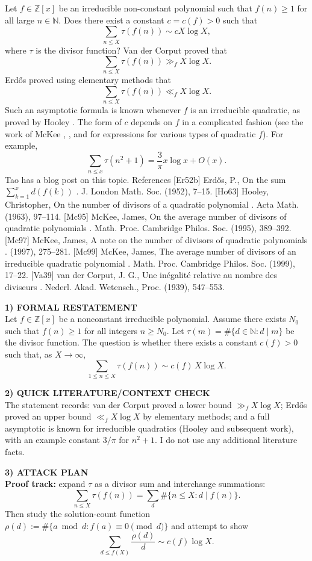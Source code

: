 Let $f\in \mathbb{Z}[x]$ be an irreducible non-constant polynomial such that $f(n)\geq 1$ for all large $n\in\mathbb{N}$. Does there exist a constant $c=c(f)>0$ such that\[\sum_{n\leq X} \tau(f(n))\sim cX\log X,\]where $\tau$ is the divisor function? Van der Corput \cite{Va39} proved that\[\sum_{n\leq X} \tau(f(n))\gg_f X\log X.\]Erd\H{o}s \cite{Er52b} proved using elementary methods that\[\sum_{n\leq X} \tau(f(n))\ll_f X\log X.\]Such an asymptotic formula is known whenever $f$ is an irreducible quadratic, as proved by Hooley \cite{Ho63}. The form of $c$ depends on $f$ in a complicated fashion (see the work of McKee \cite{Mc95}, \cite{Mc97}, and \cite{Mc99} for expressions for various types of quadratic $f$). For example,\[\sum_{n\leq x}\tau(n^2+1)=\frac{3}{\pi}x\log x+O(x).\]Tao has a blog post on this topic. References [Er52b] Erd\H{o}s, P., On the sum {$\sum^x_{k=1} d(f(k))$} . J. London Math. Soc. (1952), 7--15. [Ho63] Hooley, Christopher, On the number of divisors of a quadratic polynomial . Acta Math. (1963), 97--114. [Mc95] McKee, James, On the average number of divisors of quadratic polynomials . Math. Proc. Cambridge Philos. Soc. (1995), 389--392. [Mc97] McKee, James, A note on the number of divisors of quadratic polynomials . (1997), 275--281. [Mc99] McKee, James, The average number of divisors of an irreducible quadratic polynomial . Math. Proc. Cambridge Philos. Soc. (1999), 17--22. [Va39] van der Corput, J. G., Une in\'{e}galit\'{e}{} relative au nombre des diviseurs . Nederl. Akad. Wetensch., Proc. (1939), 547--553.


\medskip
\noindent\textbf{1) FORMAL RESTATEMENT}\\
Let $f\in\mathbb{Z}[x]$ be a nonconstant irreducible polynomial.
Assume there exists $N_0$ such that $f(n)\ge 1$ for all integers $n\ge N_0$.
Let $\tau(m)=\#\{d\in\mathbb{N}: d\mid m\}$ be the divisor function.
The question is whether there exists a constant $c(f)>0$ such that, as $X\to\infty$,
\[
\sum_{1\le n\le X} \tau(f(n)) \sim c(f)\,X\log X.
\]

\medskip
\noindent\textbf{2) QUICK LITERATURE/CONTEXT CHECK}\\
The statement records: van der Corput proved a lower bound $\gg_f X\log X$; Erd\H{o}s proved an upper bound $\ll_f X\log X$ by elementary methods; and a full asymptotic is known for irreducible quadratics (Hooley and subsequent work), with an example constant $3/\pi$ for $n^2+1$.
I do not use any additional literature facts.

\medskip
\noindent\textbf{3) ATTACK PLAN}\\
\textbf{Proof track:} expand $\tau$ as a divisor sum and interchange summations:
\[
\sum_{n\le X}\tau(f(n))=\sum_{d}\#\{n\le X: d\mid f(n)\}.
\]
Then study the solution-count function $\rho(d):=\#\{a\bmod d: f(a)\equiv 0\pmod d\}$ and attempt to show
\[
\sum_{d\le f(X)} \frac{\rho(d)}{d} \sim c(f)\log X.
\]


